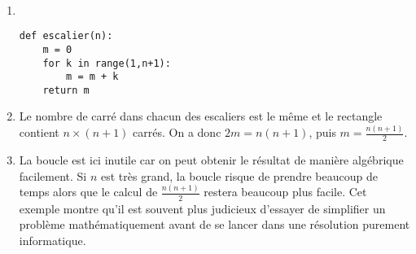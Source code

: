 \begin{correction}~
	\begin{enumerate}
		\item ~
		\begin{center}
			\begin{varwidth}[t]{.5\textwidth}
				\begin{lstlisting}[language=iPython,linewidth = 9cm]
def escalier(n):
    m = 0
    for k in range(1,n+1):
        m = m + k
    return m
\end{lstlisting}\end{varwidth}
		\end{center}
		\item Le nombre de carré dans chacun des escaliers est le même et le rectangle contient $n\times (n+1)$ carrés. On a donc $2m=n(n+1)$, puis $m=\frac{n(n+1)}{2}$.
		\item La boucle est ici inutile car on peut obtenir le résultat de manière algébrique facilement. Si $n$ est très grand, la boucle risque de prendre beaucoup de temps alors que le calcul de $\frac{n(n+1)}{2}$ restera beaucoup plus facile. Cet exemple montre qu'il est souvent plus judicieux d'essayer de simplifier un problème mathématiquement avant de se lancer dans une résolution purement informatique.
	\end{enumerate}
\end{correction}


